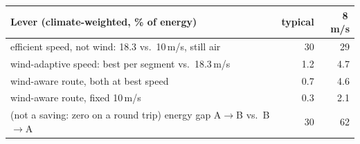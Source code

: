 \small\begin{tabular}{@{}lrr@{}}
\toprule
Lever (climate-weighted, \% of energy) & typical & 8\,m/s \\
\midrule
efficient speed, not wind: 18.3 vs.\ 10\,m/s, still air & 30 & 29 \\
wind-adaptive speed: best per segment vs.\ 18.3\,m/s & 1.2 & 4.7 \\
wind-aware route, both at best speed & 0.7 & 4.6 \\
wind-aware route, fixed 10\,m/s & 0.3 & 2.1 \\
(not a saving: zero on a round trip) energy gap A$\to$B vs.\ B$\to$A & 30 & 62 \\
\bottomrule
\end{tabular}
